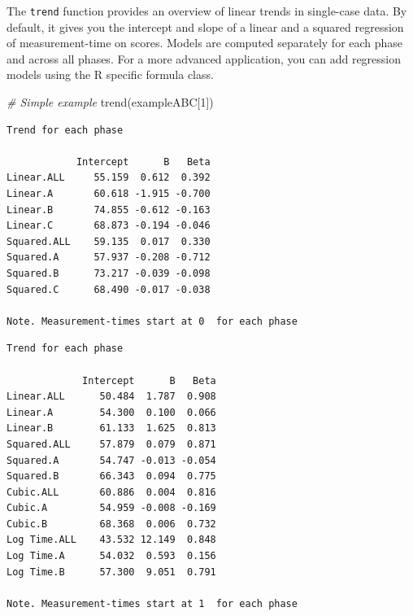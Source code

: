 \documentclass[
]{book}
\newenvironment{Shaded}{\begin{snugshade}}{\end{snugshade}}
\newcommand{\AttributeTok}[1]{\textcolor[rgb]{0.77,0.63,0.00}{#1}}
\newcommand{\CommentTok}[1]{\textcolor[rgb]{0.56,0.35,0.01}{\textit{#1}}}
\newcommand{\DecValTok}[1]{\textcolor[rgb]{0.00,0.00,0.81}{#1}}
\newcommand{\FunctionTok}[1]{\textcolor[rgb]{0.00,0.00,0.00}{#1}}
\newcommand{\NormalTok}[1]{#1}
\newcommand{\OtherTok}[1]{\textcolor[rgb]{0.56,0.35,0.01}{#1}}
\newcommand{\SpecialCharTok}[1]{\textcolor[rgb]{0.00,0.00,0.00}{#1}}
\newcommand{\StringTok}[1]{\textcolor[rgb]{0.31,0.60,0.02}{#1}}
\begin{document}
The \texttt{trend} function provides an overview of linear trends in single-case data. By default, it gives you the intercept and slope of a linear and a squared regression of measurement-time on scores. Models are computed separately for each phase and across all phases. For a more advanced application, you can add regression models using the R specific formula class.

\begin{Shaded}
\begin{Highlighting}[]
\CommentTok{\# Simple example}
\FunctionTok{trend}\NormalTok{(exampleABC[}\DecValTok{1}\NormalTok{])}
\end{Highlighting}
\end{Shaded}

\begin{verbatim}
Trend for each phase

            Intercept      B   Beta
Linear.ALL     55.159  0.612  0.392
Linear.A       60.618 -1.915 -0.700
Linear.B       74.855 -0.612 -0.163
Linear.C       68.873 -0.194 -0.046
Squared.ALL    59.135  0.017  0.330
Squared.A      57.937 -0.208 -0.712
Squared.B      73.217 -0.039 -0.098
Squared.C      68.490 -0.017 -0.038

Note. Measurement-times start at 0  for each phase
\end{verbatim}

\begin{Shaded}
\end{Shaded}

\begin{verbatim}
Trend for each phase

             Intercept      B   Beta
Linear.ALL      50.484  1.787  0.908
Linear.A        54.300  0.100  0.066
Linear.B        61.133  1.625  0.813
Squared.ALL     57.879  0.079  0.871
Squared.A       54.747 -0.013 -0.054
Squared.B       66.343  0.094  0.775
Cubic.ALL       60.886  0.004  0.816
Cubic.A         54.959 -0.008 -0.169
Cubic.B         68.368  0.006  0.732
Log Time.ALL    43.532 12.149  0.848
Log Time.A      54.032  0.593  0.156
Log Time.B      57.300  9.051  0.791

Note. Measurement-times start at 1  for each phase
\end{verbatim}
\end{document}
